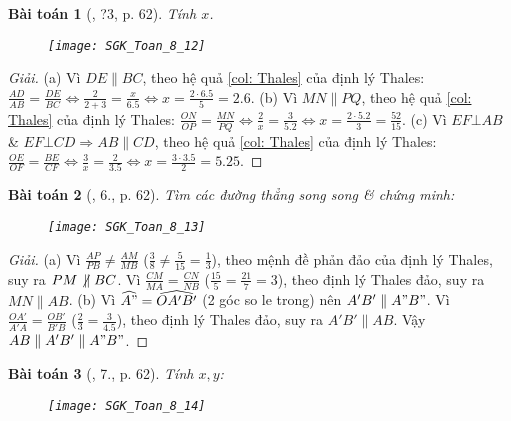 \documentclass{article}
\newtheorem{baitoan}{Bài toán}
\begin{document}
\begin{baitoan}[\cite{SGK_Toan_8_tap_2}, ?3, p. 62]
	Tính $x$.
	\begin{figure}[H]
		\centering
		\texttt{[image: SGK\_Toan\_8\_12]}
	\end{figure}
\end{baitoan}

\begin{proof}[Giải]
	(a) Vì $DE\parallel BC$, theo hệ quả \ref{col: Thales} của định lý Thales: $\frac{AD}{AB} = \frac{DE}{BC}\Leftrightarrow\frac{2}{2 + 3} = \frac{x}{6.5}\Leftrightarrow x = \frac{2\cdot6.5}{5} = 2.6$. (b) Vì $MN\parallel PQ$, theo hệ quả \ref{col: Thales} của định lý Thales: $\frac{ON}{OP} = \frac{MN}{PQ}\Leftrightarrow\frac{2}{x} = \frac{3}{5.2}\Leftrightarrow x = \frac{2\cdot5.2}{3} = \frac{52}{15}$. (c) Vì $EF\bot AB$ \& $EF\bot CD\Rightarrow AB\parallel CD$, theo hệ quả \ref{col: Thales} của định lý Thales: $\frac{OE}{OF} = \frac{BE}{CF}\Leftrightarrow\frac{3}{x} = \frac{2}{3.5}\Leftrightarrow x = \frac{3\cdot3.5}{2} = 5.25$.
\end{proof}

\begin{baitoan}[\cite{SGK_Toan_8_tap_2}, 6., p. 62]
	Tìm các đường thẳng song song \& chứng minh:
	\begin{figure}[H]
		\centering
		\texttt{[image: SGK\_Toan\_8\_13]}
	\end{figure}
\end{baitoan}

\begin{proof}[Giải]
	(a) Vì $\frac{AP}{PB}\ne\frac{AM}{MB}$ ($\frac{3}{8}\ne\frac{5}{15} = \frac{1}{3}$), theo mệnh đề phản đảo của định lý Thales, suy ra $PM\not\,\parallel BC$. Vì $\frac{CM}{MA} = \frac{CN}{NB}$ ($\frac{15}{5} = \frac{21}{7} = 3$), theo định lý Thales đảo, suy ra $MN\parallel AB$. (b) Vì $\widehat{A"} = \widehat{OA'B'}$ (2 góc so le trong) nên $A'B'\parallel A"B"$. Vì $\frac{OA'}{A'A} = \frac{OB'}{B'B}$ ($\frac{2}{3} = \frac{3}{4.5}$), theo định lý Thales đảo, suy ra $A'B'\parallel AB$. Vậy $AB\parallel A'B'\parallel A"B"$.
\end{proof}

\begin{baitoan}[\cite{SGK_Toan_8_tap_2}, 7., p. 62]
	Tính $x,y$:
	\begin{figure}[H]
		\centering
		\texttt{[image: SGK\_Toan\_8\_14]}
	\end{figure}
\end{baitoan}
\end{document}
